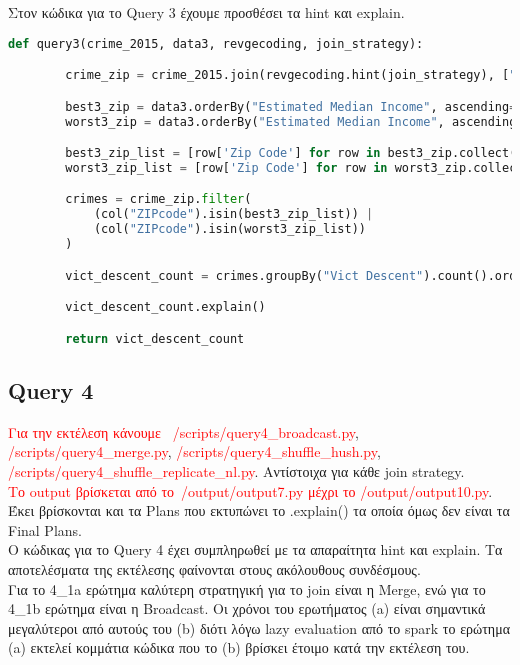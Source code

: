 \documentclass{article}
\begin{document}
\vspace{1\baselineskip}

Στον κώδικα για το Query 3 έχουμε προσθέσει τα hint και explain.\\

\begin{lstlisting}[language = Python]
    def query3(crime_2015, data3, revgecoding, join_strategy):

        crime_zip = crime_2015.join(revgecoding.hint(join_strategy), ["LAT", "LON"], "left")

        best3_zip = data3.orderBy("Estimated Median Income", ascending=False).limit(3)
        worst3_zip = data3.orderBy("Estimated Median Income", ascending=True).limit(3)

        best3_zip_list = [row['Zip Code'] for row in best3_zip.collect()]
        worst3_zip_list = [row['Zip Code'] for row in worst3_zip.collect()]

        crimes = crime_zip.filter(
            (col("ZIPcode").isin(best3_zip_list)) |
            (col("ZIPcode").isin(worst3_zip_list))
        )

        vict_descent_count = crimes.groupBy("Vict Descent").count().orderBy("count", ascending=False)

        vict_descent_count.explain()

        return vict_descent_count
\end{lstlisting}


\subsection*{Query 4}

\textcolor{red}{Για την εκτέλεση κάνουμε  /scripts/query4_broadcast.py}, \textcolor{red}{/scripts/query4_merge.py}, \textcolor{red}{/scripts/query4_shuffle_hush.py}, \textcolor{red}{/scripts/query4_shuffle_replicate_nl.py}. Αντίστοιχα για κάθε join strategy.   \\
\textcolor{red}{Το output βρίσκεται από το /output/output7.py μέχρι το /output/output10.py}. Έκει βρίσκονται και τα Plans που εκτυπώνει το .explain() τα οποία όμως δεν είναι τα Final Plans. \\ 

Ο κώδικας για το Query 4 έχει συμπληρωθεί με τα απαραίτητα hint και explain. 
Τα αποτελέσματα της εκτέλεσης φαίνονται στους ακόλουθους συνδέσμους. \\
Για το 4\_1a ερώτημα καλύτερη στρατηγική για το join είναι η Merge, ενώ για το 4\_1b ερώτημα 
είναι η Broadcast. Οι χρόνοι του ερωτήματος (a) είναι σημαντικά μεγαλύτεροι από αυτούς του 
(b) διότι λόγω lazy evaluation από το spark το ερώτημα (a) εκτελεί κομμάτια κώδικα που το (b) 
βρίσκει έτοιμο κατά την εκτέλεση του.\\
\end{document}
